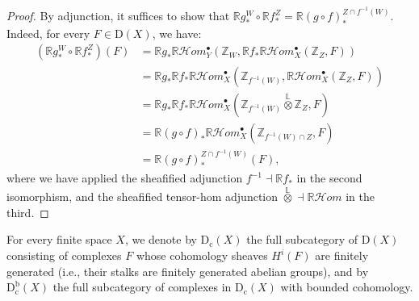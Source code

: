 \documentclass[amssymb,amscd,11pt,20pt]{amsart}
\newcommand{\LL}{{\mathbb L}}
\newcommand{\ZZ}{{\mathbb Z}}
\newcommand{\RR}{\mathbb R}
\newcommand{\0}{\mathbf 0}
\newcommand{\pun}{{\scriptscriptstyle \bullet}}
\newcommand{\HHom}{\mathcal{H}om}
\theoremstyle{plain}
\numberwithin{equation}{thm}
\begin{document}
\begin{proof} By adjunction, it suffices to show that $\RR g_*^W\circ\RR f_*^Z =\RR (g\circ f)_*^{Z\cap f^{-1}(W)}$. Indeed, for every $F\in \mathrm{D}(X)$, we have:
\[\begin{aligned} 
(\mathbb{R} g_*^W \circ \mathbb{R} f_*^Z)(F) 
&= \mathbb{R} g_* \mathbb{R}\mathcal{H}om_Y^\bullet(\mathbb{Z}_W, \mathbb{R} f_* \mathbb{R}\mathcal{H}om_X^\bullet(\mathbb{Z}_Z, F)) \\ 
&= \mathbb{R} g_* \mathbb{R} f_* \mathbb{R}\mathcal{H}om_X^\bullet(\mathbb{Z}_{f^{-1}(W)}, \mathbb{R}\mathcal{H}om_X^\bullet(\mathbb{Z}_Z, F)) \\ 
&= \mathbb{R} g_* \mathbb{R} f_* \mathbb{R}\mathcal{H}om_X^\bullet(\mathbb{Z}_{f^{-1}(W)} \overset{\mathbb{L}}{\otimes} \mathbb{Z}_Z, F) \\ 
&= \mathbb{R}(g \circ f)_* \mathbb{R}\mathcal{H}om_X^\bullet(\mathbb{Z}_{f^{-1}(W) \cap Z}, F) \\ 
&= \mathbb{R}(g \circ f)_*^{Z \cap f^{-1}(W)}(F),
\end{aligned}
\]
where we have applied the sheafified adjunction $f^{-1} \dashv \mathbb{R} f_*$ in the second isomorphism, and the sheafified tensor-hom adjunction $\overset{\mathbb{L}}{\otimes} \dashv \mathbb{R}\mathcal{H}om$ in the third.

\end{proof}

\medskip
{}
\medskip

For every finite space $X$, we denote by $\mathrm{D_c}(X)$   the full subcategory of $\mathrm{D}(X)$ consisting of complexes $F$   whose cohomology sheaves  $H^i(F)$ are finitely generated (i.e., their stalks are finitely generated abelian groups), and by $\mathrm{D^b_c}(X)$ the full subcategory of complexes in $\mathrm{D_c}(X)$ with bounded cohomology.
\end{document}

